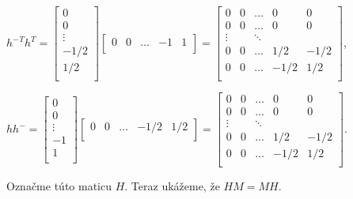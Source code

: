 \begin{dokaz}
\begin{center}
$
{h^-}^T h^T = 
\begin{bmatrix}
0 \\
0 \\
\vdots \\
-1/2 \\
1/2 \\
\end{bmatrix}
\begin{bmatrix}
0 & 0 & \ldots & -1 & 1 \\
\end{bmatrix}
=
\begin{bmatrix}
0 & 0 & \ldots & 0 & 0 \\
0 & 0 & \ldots & 0 & 0 \\
\vdots && \ddots \\
0 & 0 & \ldots & 1/2 & -1/2 \\
0 & 0 & \ldots & -1/2 & 1/2 \\
\end{bmatrix}
$,
\end{center}

\begin{center}
$
h h^- = 
\begin{bmatrix}
0 \\
0 \\
\vdots \\
-1 \\
1 \\
\end{bmatrix}
\begin{bmatrix}
0 & 0 & \ldots & -1/2 & 1/2 \\
\end{bmatrix}
=
\begin{bmatrix}
0 & 0 & \ldots & 0 & 0 \\
0 & 0 & \ldots & 0 & 0 \\
\vdots && \ddots \\
0 & 0 & \ldots & 1/2 & -1/2 \\
0 & 0 & \ldots & -1/2 & 1/2 \\
\end{bmatrix}
$.
\end{center}

Označme túto maticu $H$. Teraz ukážeme, že $HM = MH$.


\end{dokaz}
